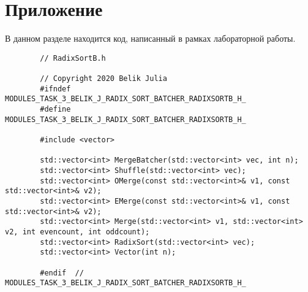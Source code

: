 \documentclass{report}
\begin{document}
	\section*{Приложение}
	В данном разделе находится код, написанный в рамках лабораторной работы.
	\begin{lstlisting}
		// RadixSortB.h
		
		// Copyright 2020 Belik Julia
		#ifndef MODULES_TASK_3_BELIK_J_RADIX_SORT_BATCHER_RADIXSORTB_H_
		#define MODULES_TASK_3_BELIK_J_RADIX_SORT_BATCHER_RADIXSORTB_H_
		
		#include <vector>
		
		std::vector<int> MergeBatcher(std::vector<int> vec, int n);
		std::vector<int> Shuffle(std::vector<int> vec);
		std::vector<int> OMerge(const std::vector<int>& v1, const std::vector<int>& v2);
		std::vector<int> EMerge(const std::vector<int>& v1, const std::vector<int>& v2);
		std::vector<int> Merge(std::vector<int> v1, std::vector<int> v2, int evencount, int oddcount);
		std::vector<int> RadixSort(std::vector<int> vec);
		std::vector<int> Vector(int n);
		
		#endif  // MODULES_TASK_3_BELIK_J_RADIX_SORT_BATCHER_RADIXSORTB_H_
	\end{lstlisting}
\end{document}
